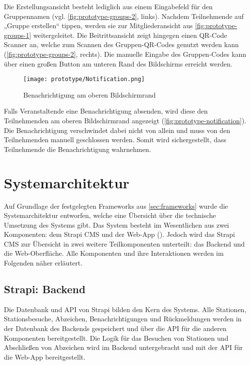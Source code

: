 Die Erstellungsansicht besteht lediglich aus einem Eingabefeld für den
Gruppennamen (vgl. \autoref{fig:prototype-groups-2}, links). Nachdem
Teilnehmende auf „Gruppe erstellen“ tippen, werden sie zur Mitgliederansicht aus
\autoref{fig:prototype-groups-1} weitergeleitet. Die Beitrittsansicht zeigt
hingegen einen QR-Code Scanner an, welche zum Scannen des Gruppen-QR-Codes
genutzt werden kann (\autoref{fig:prototype-groups-2}, rechts). Die manuelle
Eingabe des Gruppen-Codes kann über einen großen Button am unteren Rand des Bildschirms
erreicht werden.

\begin{figure}[htpb]
    \centering
    \texttt{[image: prototype/Notification.png]}
    \caption{Benachrichtigung am oberen Bildschirmrand}
    \label{fig:prototype-notification}
\end{figure}

Falls Veranstaltende eine Benachrichtigung absenden, wird diese den
Teilnehmenden am oberen Bildschirmrand angezeigt (\autoref{fig:prototype-notification}). Die Benachrichtigung verschwindet dabei
nicht von allein und muss von den Teilnehmenden manuell geschlossen werden.
Somit wird sichergestellt, dass Teilnehmende die Benachrichtigung wahrnehmen.

\section{Systemarchitektur} \label{sec:system-architecture}


Auf Grundlage der festgelegten Frameworks aus \autoref{sec:frameworks} wurde die
Systemarchitektur entworfen, welche eine Übersicht über die technische Umsetzung
des Systems gibt. Das System besteht im Wesentlichen aus zwei Komponenten: dem
Strapi \ac{CMS} und der Web-App (). Jedoch wird das Strapi \ac{CMS} zur Übersicht
in zwei weitere Teilkomponenten unterteilt: das Backend und die
Web-Oberfläche. Alle Komponenten und ihre Interaktionen werden im Folgenden
näher erläutert.

\subsection{Strapi: Backend}

Die Datenbank und API von Strapi bilden den Kern des Systems. Alle Stationen,
Stationsbesuche, Abzeichen, Benachrichtigungen und Rückmeldungen werden in der
Datenbank des Backends gespeichert und über die API für die anderen Komponenten
bereitgestellt. Die Logik für das Besuchen von Stationen und Abschließen von
Abzeichen wird im Backend untergebracht und mit der API für die Web-App
bereitgestellt.

